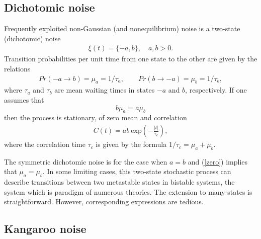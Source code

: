 \documentclass[authoryear,draft,1p,times]{elsarticle}
\renewcommand{\=}{\stackrel{\mathrm{d}}{=}}
\begin{document}

\subsection{Dichotomic noise}

Frequently exploited non-Gaussian (and nonequilibrium) 
noise is a two-state (dichotomic) 
noise \cite{hang1}
%
\begin{eqnarray} \label{dich}
\xi(t) = \{-a , b\},  \quad a, b > 0.
\end{eqnarray}
%
Transition probabilities per unit time from one state to the other are
given by the relations
%
\begin{eqnarray} \label{jum}
 Pr(-a\rightarrow b)=\mu_a = 1/\tau_a,
\qquad Pr(b\rightarrow -a)=\mu_b = 1/\tau_b, 
\end{eqnarray}
%
where $\tau _a$ and $\tau _b$ are mean waiting times in states $-a$ and $b$, 
respectively. If one assumes that 
%
\begin{equation} \label{zero}
b \mu_a= a \mu_b
\end{equation}
%
then the process is stationary, of zero mean and correlation 
%
\begin{eqnarray} \label{momd}
C(t)  = a b \:\mbox{exp}\left(-\frac{|t|}{\tau_c} \right), 
\end{eqnarray}
%
where the correlation time $\tau_c$ is given by the formula 
$1/\tau_c = \mu_a + \mu_b$.  

The symmetric dichotomic noise is for the case when $a=b$  and (\ref{zero})   implies that  
$\mu_a=\mu_b$. 
In some limiting cases, this two-state stochastic  process  can describe 
 transitions between two metastable states in bistable systems, the system 
which is paradigm of numerous theories.   
The extension to many-states is straightforward. However, corresponding 
expressions are tedious.  

 
\subsection{Kangaroo noise}
\end{document}
